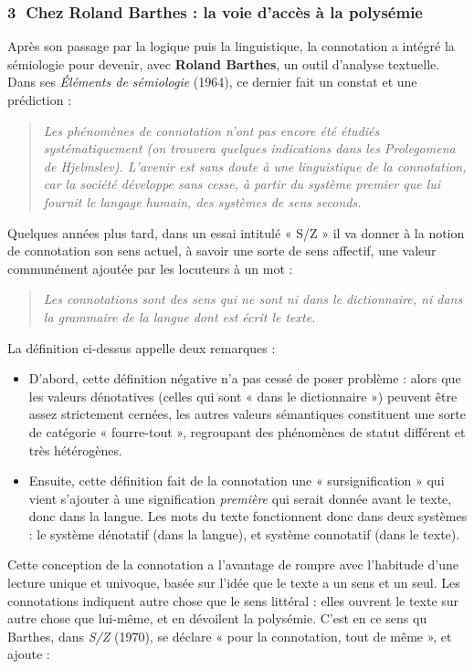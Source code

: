 \subsubsection*{\textcircled{\scriptsize 3} Chez Roland Barthes : la voie d’accès à la polysémie}
Après son passage par la logique puis la linguistique, la connotation a intégré la sémiologie pour devenir, avec \textbf{Roland Barthes}, un outil d’analyse textuelle. Dans ses \textit{Éléments de sémiologie} (1964), ce dernier fait un constat et une prédiction :
\begin{quote}\small\itshape
Les phénomènes de connotation n’ont pas encore été étudiés systématiquement (on trouvera quelques indications dans les Prolegomena de Hjelmslev). L’avenir est sans doute à une linguistique de la connotation, car la société développe sans cesse, à partir du système premier que lui fournit le langage humain, des systèmes de sens seconds.
\end{quote}
Quelques années plus tard, dans un essai intitulé « S/Z » il va donner à la notion de connotation son sens actuel, à savoir une sorte de sens affectif, une valeur communément ajoutée par les locuteurs à un mot :
\begin{quote}\small\itshape
Les connotations sont des sens qui ne sont ni dans le dictionnaire, ni dans la grammaire de la langue dont est écrit le texte.
\end{quote}
La définition ci-dessus appelle deux remarques :
\begin{itemize}
\item D’abord, cette définition négative n’a pas cessé de poser problème : alors que les valeurs dénotatives (celles qui sont « dans le dictionnaire ») peuvent être assez strictement cernées, les autres valeurs sémantiques constituent une sorte de catégorie « fourre-tout », regroupant des phénomènes de statut différent et très hétérogènes.
\item Ensuite, cette définition fait de la connotation une « sursignification » qui vient s’ajouter à une signification \textit{première} qui serait donnée avant le texte, donc dans la langue. Les mots du texte fonctionnent donc dans deux systèmes : le système dénotatif (dans la langue), et système connotatif (dans le texte).
\end{itemize}
Cette conception de la connotation a l’avantage de rompre avec l’habitude d’une lecture unique et univoque, basée sur l’idée que le texte a un sens et un seul. Les connotations indiquent autre chose que le sens littéral : elles ouvrent le texte sur autre chose que lui-même, et en dévoilent la polysémie. C’est en ce sens qu Barthes, dans \textit{S/Z} (1970), se déclare « pour la connotation, tout de même », et ajoute :
